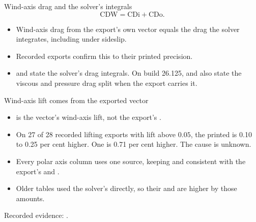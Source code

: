 \begin{frame}{Wind-axis drag and the solver's integrals}
\[
  \mathrm{CDW}=\mathrm{CDi}+\mathrm{CDo}.
\]
\begin{itemize}
  \item Wind-axis drag from the export's own vector equals the drag the
        solver integrates, including under sideslip.
  \item Recorded exports confirm this to their printed precision.
  \item {} and  state the solver's drag integrals.
        On build 26.125,  and  also state the viscous
        and pressure drag split when the export carries it.
\end{itemize}
\end{frame}

\begin{frame}{Wind-axis lift comes from the exported vector}
\begin{itemize}\small
  \item {} is the vector's wind-axis lift, not the export's .
  \item On 27 of 28 recorded lifting exports with lift above $0.05$,
        the printed  is 0.10 to 0.25 per cent higher. One is
        0.71 per cent higher. The cause is unknown.
  \item Every polar axis column uses one source, keeping  and
         consistent with the export's  and .
  \item Older tables used the solver's  directly, so their
         and  are higher by those amounts.
\end{itemize}
\vspace{2mm}
{\scriptsize Recorded evidence:
.}
\end{frame}

